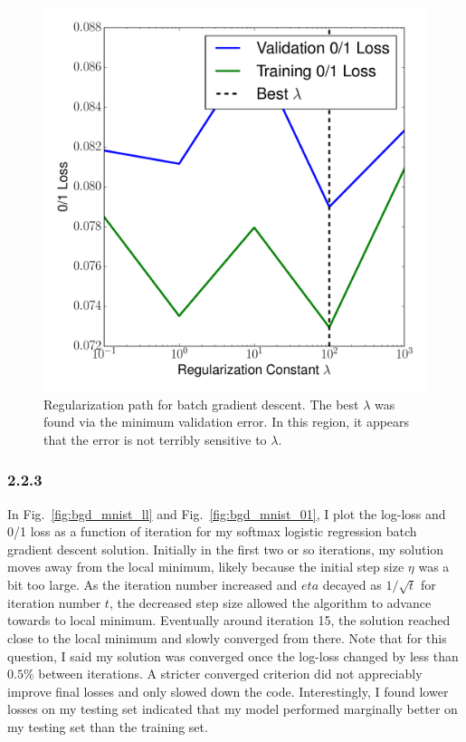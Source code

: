 \documentclass[12pt]{amsart}
\begin{document}
\begin{figure}[H]
	\includegraphics[width=\columnwidth]{bgd_reg_path.pdf}
    \caption{Regularization path for batch gradient descent.  The best $\lambda$ was found via the minimum validation error.  In this region, it appears that the error is not terribly sensitive to $\lambda$.}
    \label{fig:bgd_reg_path}
\end{figure}

\subsubsection*{2.2.3}

In Fig.~\ref{fig:bgd_mnist_ll} and Fig.~\ref{fig:bgd_mnist_01}, I plot the log-loss and 0/1 loss as a function of iteration for my softmax logistic regression batch gradient descent solution.  Initially in the first two or so iterations, my solution moves away from the local minimum, likely because the initial step size $\eta$ was a bit too large.  As the iteration number increased and $eta$ decayed as $1/\sqrt{t}$ for iteration number $t$, the decreased step size allowed the algorithm to advance towards to local minimum.  Eventually around iteration 15, the solution reached close to the local minimum and slowly converged from there.  Note that for this question, I said my solution was converged once the log-loss changed by less than $0.5\%$ between iterations.  A stricter converged criterion did not appreciably improve final losses and only slowed down the code.  Interestingly, I found lower losses on my testing set indicated that my model performed marginally better on my testing set than the training set.
\end{document}
